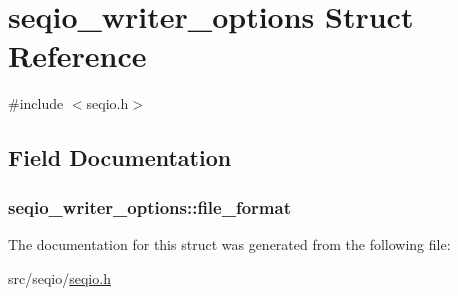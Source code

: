 \hypertarget{structseqio__writer__options}{\section{seqio\-\_\-writer\-\_\-options Struct Reference}
\label{structseqio__writer__options}
}


{\ttfamily \#include $<$seqio.\-h$>$}



\subsection{Field Documentation}
\hypertarget{structseqio__writer__options_a9f87777445b83e1934500c2eafbe0844}{
\subsubsection[{file\-\_\-format}]{ seqio\-\_\-writer\-\_\-options\-::file\-\_\-format}}\label{structseqio__writer__options_a9f87777445b83e1934500c2eafbe0844}


The documentation for this struct was generated from the following file\-:\begin{DoxyCompactItemize}
\item 
src/seqio/\hyperlink{seqio_8h}{seqio.\-h}\end{DoxyCompactItemize}
